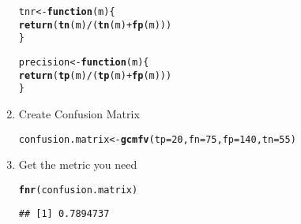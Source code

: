 \documentclass[../../dsa1101_notes.Rtex]{subfiles}\usepackage[]{graphicx}\usepackage[]{color}
\makeatletter
\newcommand{\hlnum}[1]{\textcolor[rgb]{0.686,0.059,0.569}{#1}}%
\newcommand{\hlopt}[1]{\textcolor[rgb]{0,0,0}{#1}}%
\newcommand{\hlstd}[1]{\textcolor[rgb]{0.345,0.345,0.345}{#1}}%
\newcommand{\hlkwa}[1]{\textcolor[rgb]{0.161,0.373,0.58}{\textbf{#1}}}%
\newcommand{\hlkwb}[1]{\textcolor[rgb]{0.69,0.353,0.396}{#1}}%
\newcommand{\hlkwc}[1]{\textcolor[rgb]{0.333,0.667,0.333}{#1}}%
\newcommand{\hlkwd}[1]{\textcolor[rgb]{0.737,0.353,0.396}{\textbf{#1}}}%
\newenvironment{kframe}{%
 \def\at@end@of@kframe{}%
 \ifinner\ifhmode%
  \def\at@end@of@kframe{\end{minipage}}%
  \begin{minipage}{\columnwidth}%
 \fi\fi%
 \def\FrameCommand##1{\hskip\@totalleftmargin \hskip-\fboxsep
 \colorbox{shadecolor}{##1}\hskip-\fboxsep
     \hskip-\linewidth \hskip-\@totalleftmargin \hskip\columnwidth}%
 \MakeFramed {\advance\hsize-\width
   \@totalleftmargin\z@ \linewidth\hsize
   \@setminipage}}%
 {\par\unskip\endMakeFramed%
 \at@end@of@kframe}
\newenvironment{knitrout}{}{} %
\makeatother
\begin{document}
\begin{enumerate}
\begin{knitrout}
\begin{kframe}
\begin{alltt}
\hlstd{tnr} \hlkwb{<-} \hlkwa{function}\hlstd{(}\hlkwc{m}\hlstd{) \{}
  \hlkwd{return} \hlstd{(}\hlkwd{tn}\hlstd{(m)}\hlopt{/}\hlstd{(}\hlkwd{tn}\hlstd{(m)}\hlopt{+}\hlkwd{fp}\hlstd{(m)))}
\hlstd{\}}

\hlstd{precision} \hlkwb{<-} \hlkwa{function}\hlstd{(}\hlkwc{m}\hlstd{) \{}
  \hlkwd{return} \hlstd{(}\hlkwd{tp}\hlstd{(m)}\hlopt{/}\hlstd{(}\hlkwd{tp}\hlstd{(m)}\hlopt{+}\hlkwd{fp}\hlstd{(m)))}
\hlstd{\}}
\end{alltt}
\end{kframe}
\end{knitrout}
\item Create Confusion Matrix
\begin{knitrout}
\color{fgcolor}\begin{kframe}
\begin{alltt}
\hlstd{confusion.matrix} \hlkwb{<-} \hlkwd{gcmfv}\hlstd{(}\hlkwc{tp}\hlstd{=}\hlnum{20}\hlstd{,} \hlkwc{fn}\hlstd{=}\hlnum{75}\hlstd{,} \hlkwc{fp}\hlstd{=}\hlnum{140}\hlstd{,} \hlkwc{tn}\hlstd{=}\hlnum{55}\hlstd{)}
\end{alltt}
\end{kframe}
\end{knitrout}
\item Get the metric you need
\begin{knitrout}
\color{fgcolor}\begin{kframe}
\begin{alltt}
\hlkwd{fnr}\hlstd{(confusion.matrix)}
\end{alltt}
\begin{verbatim}
## [1] 0.7894737
\end{verbatim}
\end{kframe}
\end{knitrout}
\end{enumerate}
\end{document}
